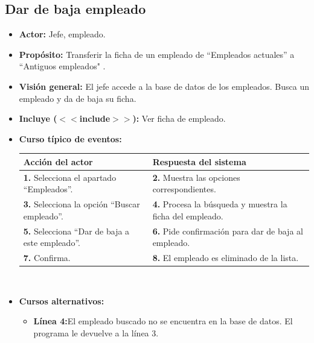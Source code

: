 \documentclass[spanish,a4paper,11pt, twoside]{report}	%
\begin{document}

	\subsection{Dar de baja empleado}	
			\begin{itemize}
			\item \textbf{Actor:} Jefe, empleado.
			\item \textbf{Propósito:} Transferir la ficha de un empleado de “Empleados actuales” a “Antiguos empleados" .
			\item \textbf{Visión general:} El jefe accede a
				la base de datos de los empleados. Busca un empleado y da de baja su ficha.
			\item \textbf{Incluye ($<<$include$>>$):} Ver ficha de empleado.
			\item \textbf{Curso típico de eventos:} 	\\
				\begin{tabular}{|p{6cm}||p{6cm}|}
				\hline
				\textbf{Acción del actor} & \textbf{Respuesta del sistema} \\ \hline \hline
				\textbf{1.} Selecciona el apartado ``Empleados''. & 
				\textbf{2.} Muestra las opciones correspondientes. \\ \hline
				\textbf{3.} Selecciona la opción ``Buscar empleado''.	& 
				\textbf{4.} Procesa la búsqueda y muestra la ficha del empleado. \\ \hline
				\textbf{5.} Selecciona ``Dar de baja a este empleado''. & 
				\textbf{6.} Pide confirmación para dar de baja al empleado.\\ \hline
				\textbf{7.} Confirma. & 
				\textbf{8.} El empleado es eliminado de la lista. \\ \hline
			\end{tabular}
			\\
			\item \textbf{Cursos alternativos:} 
			\begin{itemize}
			\item  \textbf{Línea 4:}El empleado buscado no se encuentra en la base de datos. 
				El programa le devuelve a la línea 3.
			\end {itemize}
		\end{itemize}


\end{document}

